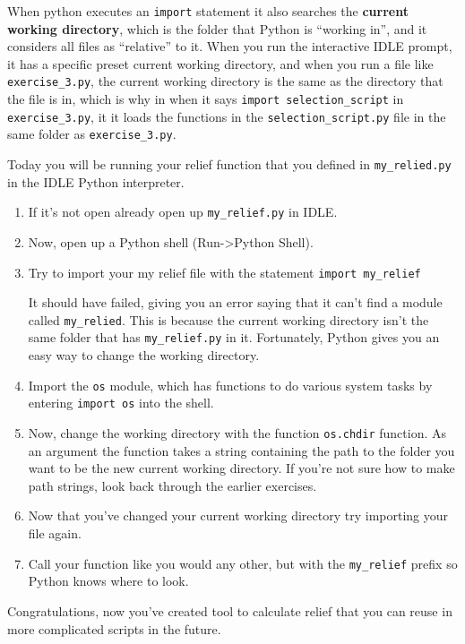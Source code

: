 \documentclass{article}
\begin{document}
When python executes an \verb+import+ statement it also searches the \textbf{current working directory}, which is the folder that Python is ``working in'', and it considers all files as ``relative'' to it. When you run the interactive IDLE prompt, it has a specific preset current working directory, and when you run a file like \verb+exercise_3.py+, the current working directory is the same as the directory that the file is in, which is why in when it says \verb+import selection_script+ in \verb+exercise_3.py+, it it loads the functions in the \verb+selection_script.py+ file in the same folder as \verb+exercise_3.py+.

Today you will be running your relief function that you defined in \verb+my_relied.py+ in the IDLE Python interpreter.
\begin{enumerate}
    \item If it's not open already open up \verb+my_relief.py+ in IDLE.
    \item Now, open up a Python shell (Run-\textgreater Python Shell).
    \item Try to import your my relief file with the statement \verb+import my_relief+

        It should have failed, giving you an error saying that it can't find a module called \verb+my_relied+.  This is because the current working directory isn't the same folder that has \verb+my_relief.py+ in it.  Fortunately, Python gives you an easy way to change the working directory.
    \item Import the \verb+os+ module, which has functions to do various system tasks by entering \verb+import os+ into the shell.
    \item Now, change the working directory with the function \verb+os.chdir+ function.  As an argument the function takes a string containing the path to the folder you want to be the new current working directory.  If you're not sure how to make path strings, look back through the earlier exercises.
    \item Now that you've changed your current working directory try importing your file again.
    \item Call your function like you would any other, but with the \verb+my_relief+ prefix so Python knows where to look.
\end{enumerate}

Congratulations, now you've created  tool to calculate relief that you can reuse in more complicated scripts in the future.
\end{document}
